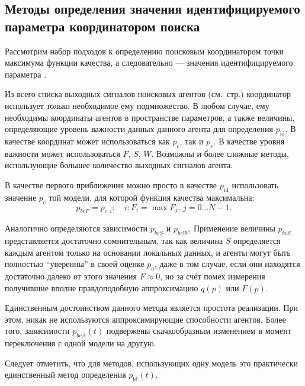 \subsection{Методы определения значения идентифицируемого параметра координатором поиска} %


Рассмотрим набор подходов к определению поисковым координатором
точки максимума функции качества, а следовательно --- значения идентифицируемого параметра \cite{atu_st99,atu_jacs2015}.

Из всего списка выходных сигналов поисковых агентов (см.~стр.\pageref{atu:d:agent_out_list})
координатор использует только необходимое ему подмножество.
В любом случае, ему необходимы координаты агентов в пространстве параметров, а также величины,
определяющие уровень важности данных данного агента для определения $p_\mathrm{id}$.
В качестве координат может использоваться как $p_c$, так и $p_e$.
В качестве уровня важности может использоваться $F$, $S$, $W$.
Возможны и более сложные методы, использующие большее
количество выходных сигналов агента.


В качестве первого приближения можно просто в качестве $p_\mathrm{id}$
использовать значение $p_c$ той модели, для которой функция качества максимальна:
%
\begin{equation}
  p_{bcF}
  =
  p_{c,i};
  \quad
  i : F_i = \max{F_j}, \, j=0 \ldots N-1 .
  \label{atu:eq:p_bcF}
\end{equation}

Аналогично определяются зависимости $p_{bcS}$ и $p_{bcW}$.
Применение величины $p_{bcS}$ представляется достаточно сомнительным,
так как величина $S$ определяется каждым агентом только на основании
локальных данных, и агенты могут быть полностью ``уверенны''
в своей оценке $p_o$, даже в том случае, если они находятся
достаточно далеко от этого значения $F \approx 0$,
но за счёт помех измерения получившие вполне правдоподобную аппроксимацию
$q(p)$ или $F(p)$.

Единственным достоинством данного метода является простота реализации.
При этом, никак не используются аппроксимирующие способности агентов.
Более того, зависимости $p_{bcA}(t)$ подвержены
скачкообразным изменением в момент переключения
с одной модели на другую.

Следует отметить, что для методов, использующих
одну модель это практически единственный метод определения $p_\mathrm{id}(t)$.

